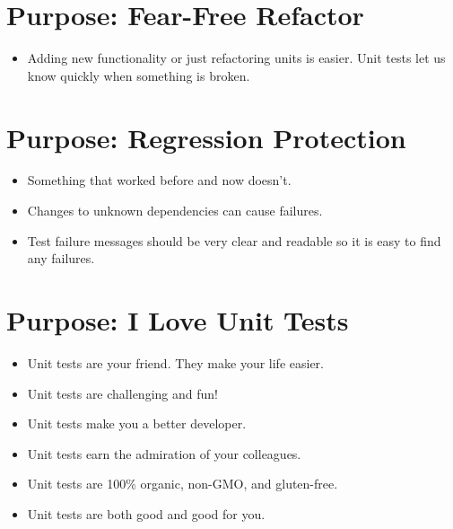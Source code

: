 \documentclass{article}
\begin{document}
\newpage
\section{Purpose: Fear-Free Refactor}
\begin{itemize}
    \item Adding new functionality or just refactoring units is easier. Unit
        tests let us know quickly when something is broken.
\end{itemize}

\newpage
\section{Purpose: Regression Protection}
\begin{itemize}
    \item Something that worked before and now doesn't.
    \item Changes to unknown dependencies can cause failures.
    \item Test failure messages should be very clear and readable so it is
        easy to find any failures.
\end{itemize}

\newpage
\section{Purpose: I Love Unit Tests}
\begin{itemize}
    \item Unit tests are your friend. They make your life easier.
    \item Unit tests are challenging and fun!
    \item Unit tests make you a better developer.
    \item Unit tests earn the admiration of your colleagues.
    \item Unit tests are 100\% organic, non-GMO, and gluten-free.
    \item Unit tests are both good and good for you.
\end{itemize}
\end{document}
